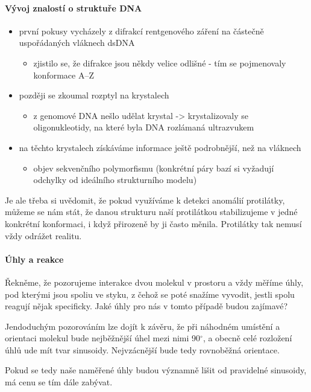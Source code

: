 \documentclass[DIV=8]{scrreprt}
\newcommand{\mybox}[2]{
    \paragraph{#1} #2
}
\begin{document}
\paragraph{Vývoj znalostí o struktuře DNA}
\begin{itemize}[nosep]
    \item první pokusy vycházely z difrakcí rentgenového záření na částečně uspořádaných vláknech dsDNA
\begin{itemize}[nosep]
    \item zjistilo se, že difrakce jsou někdy velice odlišné - tím se pojmenovaly konformace A--Z
\end{itemize}

    \item později se zkoumal rozptyl na krystalech
\begin{itemize}[nosep]
    \item z genomové DNA nešlo udělat krystal -> krystalizovaly se oligonukleotidy, na které byla DNA rozlámaná ultrazvukem
\end{itemize}

    \item na těchto krystalech získáváme informace ještě podrobnější, než na vláknech
\begin{itemize}[nosep]
    \item objev sekvenčního polymorfismu (konkrétní páry bazí si vyžadují odchylky od ideálního strukturního modelu)
\end{itemize}

\end{itemize}



Je ale třeba si uvědomit, že pokud využíváme k detekci anomálií protilátky, můžeme se nám stát, že danou strukturu naší protilátkou stabilizujeme v jedné konkrétní konformaci, i když přirozeně by ji často měnila. Protilátky tak nemusí vždy odrážet realitu.

\mybox{Úhly a reakce}{Řekněme, že pozorujeme interakce dvou molekul v prostoru a vždy měříme úhly, pod kterými jsou spoliu ve styku, z čehož se poté snažíme vyvodit, jestli spolu reagují nějak specificky. Jaké úhly pro nás v tomto případě budou zajímavé?

Jendoduchým pozorováním lze dojít k závěru, že při náhodném umístění a orientaci molekul bude nejběžnější úhel mezi nimi 90\(^{\circ}\), a obecně celé rozložení úhlů ude mít tvar sinusoidy.  Nejvzácnější bude tedy rovnoběžná orientace.

Pokud se tedy naše naměřené úhly budou významně lišit od pravidelné sinusoidy, má cenu se tím dále zabývat.}
\end{document}
